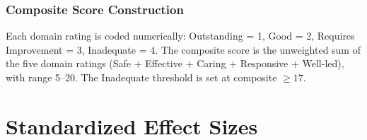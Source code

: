 \documentclass[12pt]{article}
\begin{document}
\subsubsection*{Composite Score Construction} Each domain rating is coded numerically: Outstanding = 1, Good = 2, Requires Improvement = 3, Inadequate = 4. The composite score is the unweighted sum of the five domain ratings (Safe + Effective + Caring + Responsive + Well-led), with range 5--20. The Inadequate threshold is set at composite $\geq 17$.

\section{Standardized Effect Sizes}
\label{sec:sde}


\end{document}

